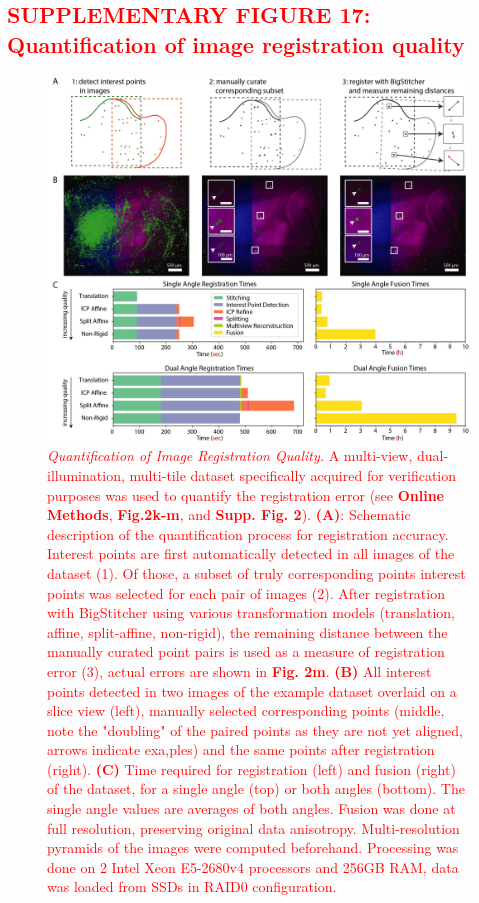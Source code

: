\documentclass[]{spie}  %
\def\red{\textcolor{red}}
\begin{document}
\subsection*{\red{SUPPLEMENTARY FIGURE 17: Quantification of image registration quality}}
\vspace{1mm}
\begin{figure}[h!]
\includegraphics[width=\textwidth]{bigstitcher_registrationquality.jpg}
\vspace{-2.0mm}
\caption{\hspace{-0.5mm} \red{\emph{Quantification of Image Registration Quality.} A multi-view, dual-illumination, multi-tile dataset specifically acquired for verification purposes was used to quantify the registration error (see \textbf{Online Methods}, \textbf{Fig.2k-m}, and \textbf{Supp. Fig. 2}). \textbf{(A)}: Schematic description of the quantification process for registration accuracy. Interest points are first automatically detected in all images of the dataset (1). Of those, a subset of truly corresponding points interest points was selected for each pair of images (2). After registration with BigStitcher using various transformation models (translation, affine, split-affine, non-rigid), the remaining distance between the manually curated point pairs is used as a measure of registration error (3), actual errors are shown in \textbf{Fig. 2m}. \textbf{(B)} All interest points detected in two images of the example dataset overlaid on a slice view (left), manually selected corresponding points (middle, note the "doubling" of the paired points as they are not yet aligned, arrows indicate exa,ples) and the same points after registration (right). \textbf{(C)} Time required for registration (left) and fusion (right) of the dataset, for a single angle (top) or both angles (bottom). The single angle values are averages of both angles. Fusion was done at full resolution, preserving original data anisotropy. Multi-resolution pyramids of the images were computed beforehand. Processing was done on 2 Intel Xeon E5-2680v4 processors and 256GB RAM, data was loaded from SSDs in RAID0 configuration.
}}
\label{fig:sup-fig-registration-quality}
\end{figure}
\end{document}

